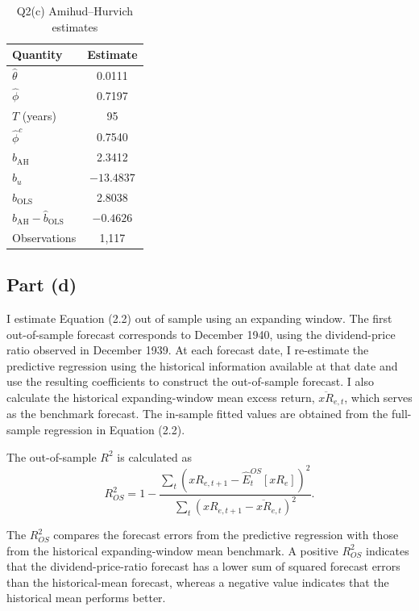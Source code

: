 \documentclass[11pt]{article}
\begin{document}
\begin{table}[htbp]
    \centering
    \caption{Q2(c) Amihud--Hurvich estimates}
    \label{tab:q2c_ah_estimates}
    \begin{tabular}{lc}
        \toprule
        Quantity & Estimate \\
        \midrule
        $\widehat\theta$ & 0.0111 \\
        $\widehat\phi$ & 0.7197 \\
        $T$ (years) & 95 \\
        $\widehat\phi^{c}$ & 0.7540 \\
        $\widehat b_{\mathrm{AH}}$ & 2.3412 \\
        $\widehat b_u$ & $-13.4837$ \\
        $\widehat b_{\mathrm{OLS}}$ & 2.8038 \\
        $\widehat b_{\mathrm{AH}}-\widehat b_{\mathrm{OLS}}$ & $-0.4626$ \\
        Observations & 1,117 \\
        \bottomrule
    \end{tabular}
\end{table}
\clearpage

\subsection{Part (d)}
I estimate Equation (2.2) out of sample using an expanding window. The first out-of-sample forecast corresponds to December 1940, using the dividend-price ratio observed in December 1939. 
At each forecast date, I re-estimate the predictive regression using the historical information available at that date and use the resulting coefficients to construct the out-of-sample forecast. 
I also calculate the historical expanding-window mean excess return, $\overline{xR}_{e,t}$, which serves as the benchmark forecast. 
The in-sample fitted values are obtained from the full-sample regression in Equation (2.2).

The out-of-sample $R^2$ is calculated as
$$
R^2_{OS}=1-\frac{\sum_t\left(xR_{e,t+1}-\widehat E_t^{OS}[xR_e]\right)^2}{\sum_t\left(xR_{e,t+1}-\overline{xR}_{e,t}\right)^2}.
$$

The $R^2_{OS}$ compares the forecast errors from the predictive regression with those from the historical expanding-window mean benchmark. A positive $R^2_{OS}$ indicates that the dividend-price-ratio forecast has a lower sum of squared forecast errors than the historical-mean forecast, whereas a negative value indicates that the historical mean performs better.
\end{document}
